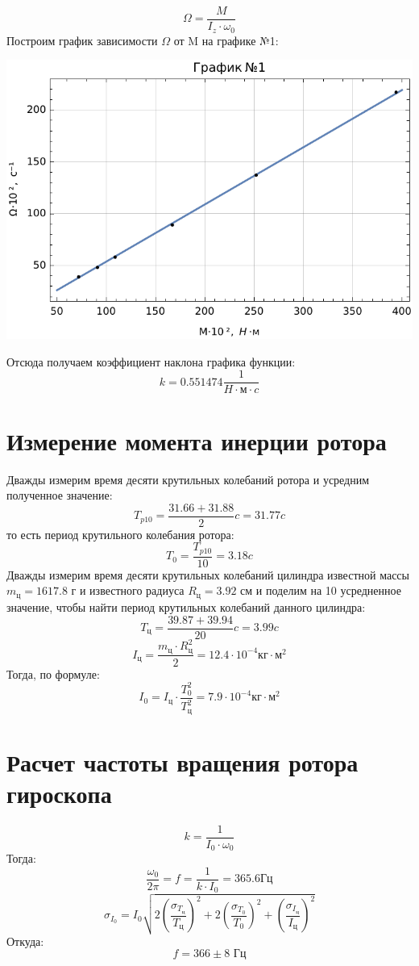\documentclass[a4paper, 12pt]{article}
\begin{document}
\[\Omega = \frac{M}{I_z\cdot\omega_0}\]
Построим график зависимости $\Omega$ от M на графике №1:
\begin{center}
\includegraphics[scale=1]{omeM}
\end{center}
Отсюда получаем коэффициент наклона графика функции:
\[k = 0.551474\frac{1}{H\cdot\text{м}\cdot c}\]

\section{Измерение момента инерции ротора}
Дважды измерим время десяти крутильных колебаний ротора и усредним полученное значение:
\[T_{p10} = \frac{31.66 + 31.88}{2} c = 31.77 c\]
то есть период крутильного колебания ротора:
\[T_0 = \frac{T_{p10}}{10} = 3.18c\]
Дважды измерим время десяти крутильных колебаний цилиндра известной массы $m_{\text{ц}} = 1617.8$ г и известного радиуса $R_{\text{ц}} = 3.92$ см и поделим на 10 усредненное значение, чтобы найти период крутильных колебаний данного цилиндра:
\[T_{\text{ц}} = \frac{39.87 + 39.94}{20}c = 3.99c\]
\[I_{\text{ц}} = \frac{m_{\text{ц}}\cdot R^2_{\text{ц}}}{2} = 12.4\cdot10^{-4}\text{кг}\cdot\text{м}^2\]
Тогда, по формуле:
\[I_0 = I_{\text{ц}}\cdot\frac{T_0^2}{T_{\text{ц}}^2} = 7.9\cdot10^{-4}\text{кг}\cdot\text{м}^2\]
\newpage
\section{Расчет частоты вращения ротора гироскопа}
\[k = \frac{1}{I_0\cdot\omega_0}\]
Тогда:
\[\frac{\omega_0}{2\pi} = f = \frac{1}{k\cdot I_0} = 365.6 \text{Гц}\]
\[\sigma_{I_0} = I_0\sqrt{2(\frac{\sigma_{T_{\text{ц}}}}{T_{\text{ц}}})^2 + 2(\frac{\sigma_{T_0}}{T_0})^2 + (\frac{\sigma_{I_{\text{ц}}}}{I_{\text{ц}}})^2}\]
Откуда:
\[f = 366 \pm 8 \text{ Гц} \]
\end{document}

